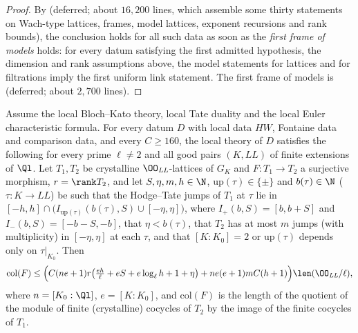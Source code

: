 \begin{proof}
By  (deferred; about $16{,}200$ lines, which assemble some thirty
statements on Wach-type lattices, frames, model lattices, exponent recursions and rank bounds), the conclusion holds for all such data as soon as
the \emph{first frame of models} holds: for every datum satisfying the first admitted hypothesis, the dimension and rank assumptions above, the
model statements for lattices and for filtrations imply the first uniform link statement. The first frame of models is
 (deferred; about $2{,}700$ lines).
\end{proof}

\begin{theorem}\label{pf:linkN-sel:thmA}
Assume the local Bloch--Kato theory, local Tate duality and the local Euler characteristic formula. For every datum $D$ with local data
$HW$, Fontaine data and comparison data, and every $C\ge160$, the local theory of $D$ satisfies the following for every prime $\ell\ne2$
and all good pairs $(K,\mathit{LL})$ of finite extensions of $\Ql$. Let $T_1,T_2$ be crystalline $\OO_{\mathit{LL}}$-lattices of $G_K$ and
$F\colon T_1\to T_2$ a surjective morphism, $r=\rank T_2$, and let $S,\eta,m,h\in\N$, $\mathrm{up}(\tau)\in\{\pm\}$ and $b(\tau)\in\N$
($\tau\colon K\to\mathit{LL}$) be such that the Hodge--Tate jumps of $T_1$ at $\tau$ lie in $[-h,h]\cap\bigl(I_{\mathrm{up}(\tau)}(b(\tau),S)
\cup[-\eta,\eta]\bigr)$, where $I_+(b,S)=[b,b+S]$ and $I_-(b,S)=[-b-S,-b]$, that $\eta<b(\tau)$, that $T_2$ has at most $m$ jumps (with
multiplicity) in $[-\eta,\eta]$ at each $\tau$, and that $[K:K_0]=2$ or $\mathrm{up}(\tau)$ depends only on $\tau|_{K_0}$. Then
\[
\mathrm{col}(F)\le\Bigl(C(n e+1)r\bigl(\tfrac{eh}{\ell}+eS+e\log_\ell h+1+\eta\bigr)+ne(e+1)mC(h+1)\Bigr)\len(\OO_{\mathit{LL}}/\ell),
\]
where $n=[K_0:\Ql]$, $e=[K:K_0]$, and $\mathrm{col}(F)$ is the length of the quotient of the module of finite (crystalline) cocycles of
$T_2$ by the image of the finite cocycles of $T_1$.
\end{theorem}

